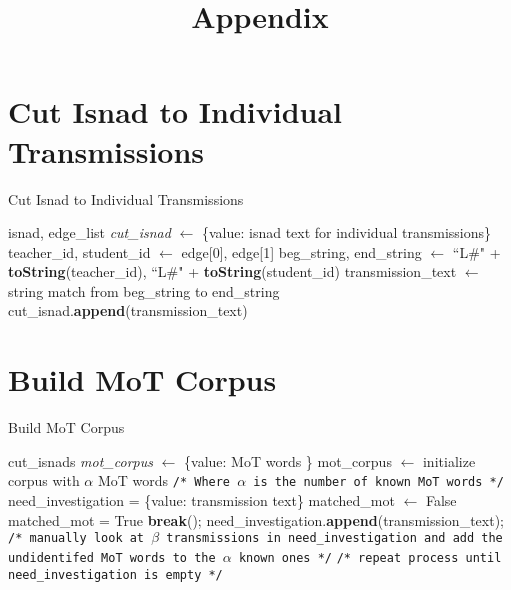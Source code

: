 \documentclass[12pt,english]{article}
\title{\textbf{Appendix}}
\date{}
\newcommand{\myindent}[1]{
\newline\makebox[#1cm]{}
}
\begin{document}
\maketitle

\section{Cut Isnad to Individual Transmissions}
\begin{center}
\begin{minipage}{.8\linewidth}
\begin{algorithm}[H]
\caption{Cut Isnad to Individual Transmissions}\label{euclid}
\begin{algorithmic}[1]
\Require isnad, edge\_list
\State \textit{cut\_isnad} $\gets$ \{value: isnad text for individual transmissions\}
\State teacher\_id, student\_id $\gets$ edge[0], edge[1]
\State beg\_string, end\_string $\gets$ ``L\#" + \textbf{toString}(teacher\_id), \myindent{4.9} ``L\#" + \textbf{toString}(student\_id)
\State transmission\_text $\gets$ string match from beg\_string to \myindent{4.17} end\_string
\State cut\_isnad.\textbf{append}(transmission\_text)
\EndForeach
\end{algorithmic}
\end{algorithm}
\end{minipage}
\end{center}

\newpage
\section{Build MoT Corpus} %
\begin{center}
\begin{minipage}{.8\linewidth}
\begin{algorithm}[H]
\caption{Build MoT Corpus}\label{euclid}
\begin{algorithmic}[1]
\Require cut\_isnads
\State \textit{mot\_corpus} $\gets$ \{value: MoT words
\}
\State mot\_corpus $\gets$ initialize corpus with $\alpha$ MoT words  \texttt{\small{/* Where $\alpha$ \myindent{2.3} is the number of known MoT words */}}
\State need\_investigation = \{value: transmission text\}
    \State matched\_mot $\gets$ False
            \State matched\_mot = True
            \State \textbf{break}();
        \EndIf 
    \EndForeach
         \State need\_investigation.\textbf{append}(transmission\_text);   
    \EndIf 
\EndForeach
{}
    \State \texttt{\small{/* manually look at $\beta$ transmissions in \myindent{.85} need\_investigation and add the undidentifed MoT \myindent{.85} words to the $\alpha$ known ones */}}
    \State \texttt{\small{/* repeat process until need\_investigation is empty */}}
\EndIf 
\end{algorithmic}
\end{algorithm}
\end{minipage}
\end{center}
\end{document}
